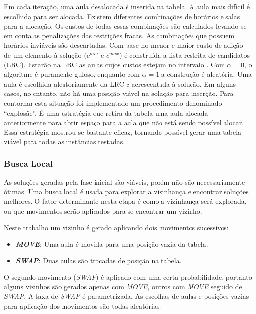 \documentclass[11pt]{article}
\begin{document}
Em cada iteração, uma aula desalocada é inserida na tabela. A aula mais difícil é escolhida para ser alocada. Existem diferentes combinações de horários e salas para a alocação. Os custos de todas essas combinações são calculados levando-se em conta as penalizações das restrições fracas. As combinações que possuem horários inviáveis são descartadas. Com base no menor e maior custo de adição de um elemento à solução ($c^{min}$ e $c^{max}$) é construída a lista restrita de candidatos (LRC). Estarão na LRC as aulas cujos custos estejam no intervalo \begin{math} [c^{min}, c^{min}+\alpha(c^{max} - c^{min})]\end{math}. Com $\alpha=0$, o algoritmo é puramente guloso, enquanto com $\alpha=1$ a construção é aleatória. Uma aula é escolhida aleatoriamente da LRC e acrescentada à solução. Em alguns casos, no entanto, não há uma posição viável na solução para inserção. Para contornar esta situação foi implementado um procedimento denominado “explosão”. É uma estratégia que retira da tabela uma aula alocada anteriormente para abrir espaço para a aula que não está sendo possível alocar. Essa estratégia mostrou-se bastante eficaz, tornando possível gerar uma tabela viável para todas as instâncias testadas.

\subsubsection{Busca Local}

As soluções geradas pela fase inicial são viáveis, porém não são necessariamente ótimas. Uma busca local é usada para explorar a vizinhança e encontrar soluções melhores. O fator determinante nesta etapa é como a vizinhança será explorada, ou que movimentos serão aplicados para se encontrar um vizinho.

Neste trabalho um vizinho é gerado aplicando dois movimentos sucessivos:

\begin{itemize}
\item \textit{\textbf{MOVE}}: Uma aula é movida para uma posição vazia da tabela.
\item \textit{\textbf{SWAP}}: Duas aulas são trocadas de posição na tabela.
\end{itemize}

O segundo movimento (\textit{SWAP}) é aplicado com uma certa probabilidade, portanto alguns vizinhos são gerados apenas com \textit{MOVE}, outros com \textit{MOVE} seguido de \textit{SWAP}. A taxa de \textit{SWAP} é parametrizada. As escolhas de aulas e posições vazias para aplicação dos movimentos são todas aleatórias.
\end{document}
